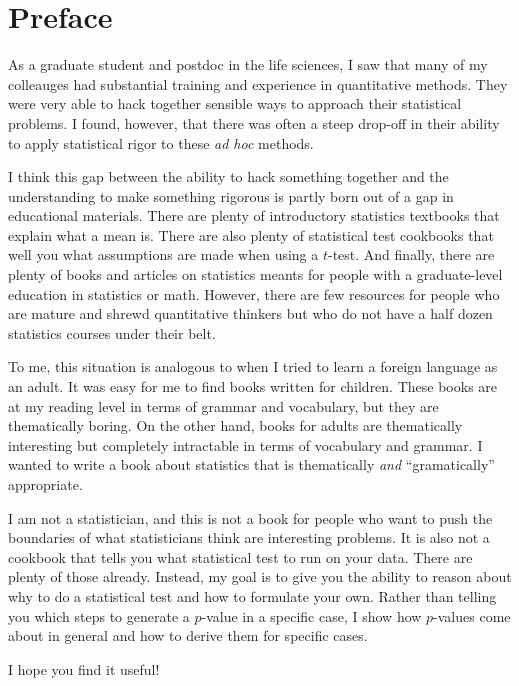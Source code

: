 
\chapter{Preface}

As a graduate student and postdoc in the life sciences, I saw that many of my
colleauges had substantial training and experience in quantitative methods. They were
very able to hack together sensible ways to approach their statistical problems.
I found, however, that there was often a
steep drop-off in their ability to apply statistical rigor to these \textit{ad hoc}
methods.

I think this gap between the ability to hack something together and the
understanding to make something rigorous is partly born out of a gap in
educational materials. There are plenty of introductory statistics
textbooks that explain what a mean is. There are also plenty of statistical
test cookbooks that well you what assumptions are made when using a $t$-test.
And finally, there are plenty of books and articles on statistics meants for people
with a graduate-level education in statistics or math. However, there are few
resources for people who are mature and shrewd quantitative thinkers but
who do not have a half dozen statistics courses under their belt.

To me, this situation is analogous to when I tried to learn a foreign language as an
adult. It was easy for me to find books written for children. These books are at my
reading level in terms of grammar and vocabulary, but they are thematically boring.
On the other hand, books for adults are thematically interesting but completely
intractable in terms of vocabulary and grammar.
I wanted to write a book about statistics that is
thematically \emph{and} ``gramatically'' appropriate.

I am not a statistician, and this is not a book for people who want to push the
boundaries of what
statisticians think are interesting problems. It is also not
a cookbook that tells you what statistical test to run on your data. There
are plenty of those already.
Instead, my goal is to give you the ability to reason about why to do a statistical
test and how to
formulate your own. Rather than telling you which steps to generate a $p$-value
in a specific case, I show how $p$-values come about in general and how to
derive them for specific cases.

I hope you find it useful!
